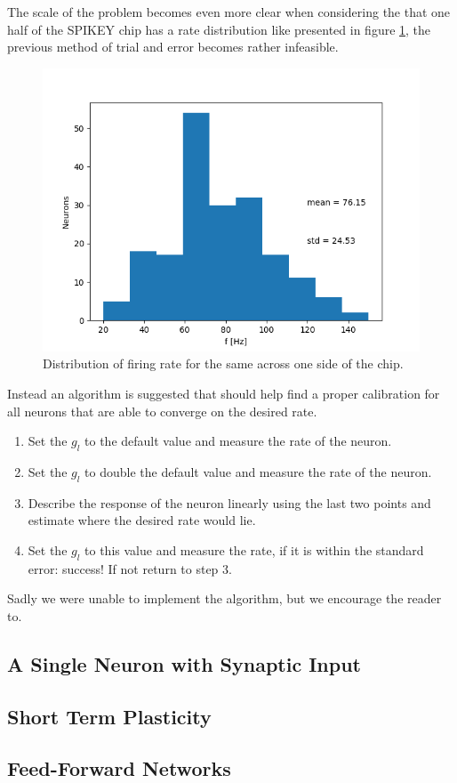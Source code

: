 \documentclass[a4paper,twocolumn]{article}
\begin{document}
The scale of the problem becomes even more clear when considering the that one
half of the SPIKEY chip has a rate distribution like presented in figure
\ref{fig:distribution}, the previous method of trial and error becomes rather
infeasible.

\begin{figure}[ht]
    \centering
    \includegraphics[width=.5\textwidth]{figures/rate-distribution.png}
    \caption{Distribution of firing rate for the same across one side of the
    chip.}
    \label{fig:distribution}
\end{figure}

Instead an algorithm is suggested that should help find a proper calibration for
all neurons that are able to converge on the desired rate.
\begin{enumerate}
    \item Set the $g_l$ to the default value and measure the rate of the neuron.
    \item Set the $g_l$ to double the default value and measure the rate of the
        neuron.
    \item Describe the response of the neuron linearly using the last two
        points and estimate where the desired rate would lie.
    \item Set the $g_l$ to this value and measure the rate, if it is within the
        standard error: success! If not return to step 3.
\end{enumerate}
Sadly we were unable to implement the algorithm, but we encourage the reader
to.

\subsection{A Single Neuron with Synaptic Input}
\subsection{Short Term Plasticity}

\subsection{Feed-Forward Networks}
\label{sec:feed-forward}
\end{document}
